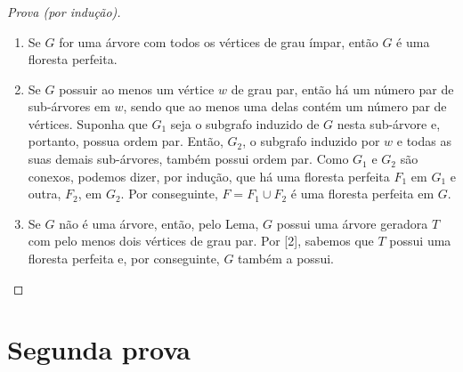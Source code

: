 \documentclass{beamer}
\begin{document}
\begin{frame}
    \frametitle{}

    \begin{proof}[Prova (por indução)]
        \begin{enumerate}
            \item Se $G$ for uma árvore com todos os vértices de grau ímpar, então $G$ é uma floresta perfeita.
            \item Se $G$ possuir ao menos um vértice $w$ de grau par, então há um número par de sub-árvores em $w$, sendo que ao menos uma delas contém um número par de vértices. Suponha que $G_{1}$ seja o subgrafo induzido de $G$ nesta sub-árvore e, portanto, possua ordem par. Então, $G_{2}$, o subgrafo induzido por $w$ e todas as suas demais sub-árvores, também possui ordem par. Como $G_{1}$ e $G_{2}$ são conexos, podemos dizer, por indução, que há uma floresta perfeita $F_{1}$ em $G_{1}$ e outra, $F_{2}$, em $G_{2}$. Por conseguinte, $F = F_{1} \cup F_{2}$ é uma floresta perfeita em $G$.
            \item Se $G$ não é uma árvore, então, pelo Lema, $G$ possui uma árvore geradora $T$ com pelo menos dois vértices de grau par. Por [2], sabemos que $T$ possui uma floresta perfeita e, por conseguinte, $G$ também a possui.
        \end{enumerate}
    \end{proof}

\end{frame}

\section{Segunda prova}



\end{document}
